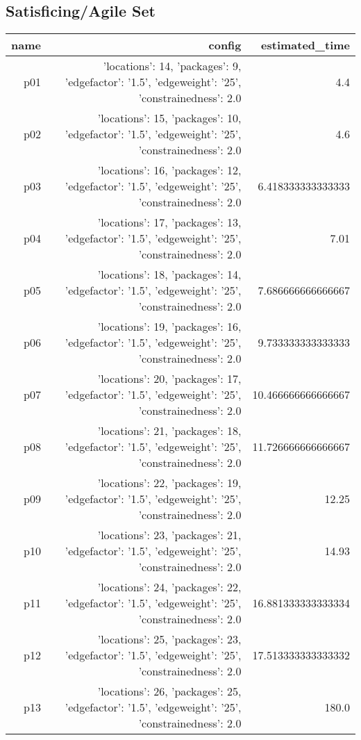 \documentclass{article}
\begin{document}
                                \subsection*{Satisficing/Agile Set}
                                
                            \begin{center}
                            \scriptsize
                            \begin{tabular}{r|r|r}
                            name & config & estimated\_time\\\midrule
                              p01&{'locations': 14, 'packages': 9, 'edgefactor': '1.5', 'edgeweight': '25', 'constrainedness': 2.0}&4.4\\
  p02&{'locations': 15, 'packages': 10, 'edgefactor': '1.5', 'edgeweight': '25', 'constrainedness': 2.0}&4.6\\
  p03&{'locations': 16, 'packages': 12, 'edgefactor': '1.5', 'edgeweight': '25', 'constrainedness': 2.0}&6.418333333333333\\
  p04&{'locations': 17, 'packages': 13, 'edgefactor': '1.5', 'edgeweight': '25', 'constrainedness': 2.0}&7.01\\
  p05&{'locations': 18, 'packages': 14, 'edgefactor': '1.5', 'edgeweight': '25', 'constrainedness': 2.0}&7.686666666666667\\
  p06&{'locations': 19, 'packages': 16, 'edgefactor': '1.5', 'edgeweight': '25', 'constrainedness': 2.0}&9.733333333333333\\
  p07&{'locations': 20, 'packages': 17, 'edgefactor': '1.5', 'edgeweight': '25', 'constrainedness': 2.0}&10.466666666666667\\
  p08&{'locations': 21, 'packages': 18, 'edgefactor': '1.5', 'edgeweight': '25', 'constrainedness': 2.0}&11.726666666666667\\
  p09&{'locations': 22, 'packages': 19, 'edgefactor': '1.5', 'edgeweight': '25', 'constrainedness': 2.0}&12.25\\
  p10&{'locations': 23, 'packages': 21, 'edgefactor': '1.5', 'edgeweight': '25', 'constrainedness': 2.0}&14.93\\
  p11&{'locations': 24, 'packages': 22, 'edgefactor': '1.5', 'edgeweight': '25', 'constrainedness': 2.0}&16.881333333333334\\
  p12&{'locations': 25, 'packages': 23, 'edgefactor': '1.5', 'edgeweight': '25', 'constrainedness': 2.0}&17.513333333333332\\
  p13&{'locations': 26, 'packages': 25, 'edgefactor': '1.5', 'edgeweight': '25', 'constrainedness': 2.0}&180.0\\

\end{tabular}
\end{center}
\end{document}
